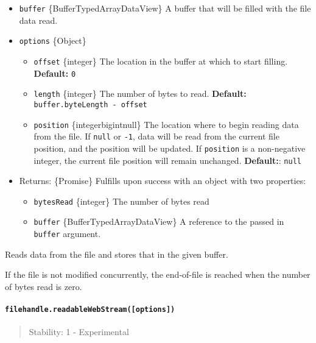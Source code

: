 \begin{itemize}
\tightlist
\item
  \texttt{buffer} \{Buffer\textbar TypedArray\textbar DataView\} A
  buffer that will be filled with the file data read.
\item
  \texttt{options} \{Object\}

  \begin{itemize}
  \tightlist
  \item
    \texttt{offset} \{integer\} The location in the buffer at which to
    start filling. \textbf{Default:} \texttt{0}
  \item
    \texttt{length} \{integer\} The number of bytes to read.
    \textbf{Default:} \texttt{buffer.byteLength\ -\ offset}
  \item
    \texttt{position} \{integer\textbar bigint\textbar null\} The
    location where to begin reading data from the file. If \texttt{null}
    or \texttt{-1}, data will be read from the current file position,
    and the position will be updated. If \texttt{position} is a
    non-negative integer, the current file position will remain
    unchanged. \textbf{Default:}: \texttt{null}
  \end{itemize}
\item
  Returns: \{Promise\} Fulfills upon success with an object with two
  properties:

  \begin{itemize}
  \tightlist
  \item
    \texttt{bytesRead} \{integer\} The number of bytes read
  \item
    \texttt{buffer} \{Buffer\textbar TypedArray\textbar DataView\} A
    reference to the passed in \texttt{buffer} argument.
  \end{itemize}
\end{itemize}

Reads data from the file and stores that in the given buffer.

If the file is not modified concurrently, the end-of-file is reached
when the number of bytes read is zero.

\paragraph{\texorpdfstring{\texttt{filehandle.readableWebStream({[}options{]})}}{filehandle.readableWebStream({[}options{]})}}\label{filehandle.readablewebstreamoptions}

\begin{quote}
Stability: 1 - Experimental
\end{quote}

